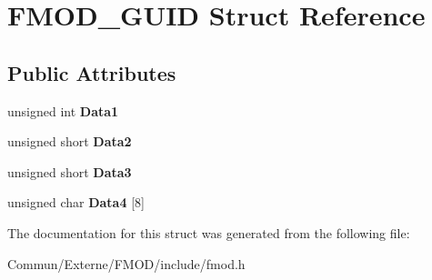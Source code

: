 \hypertarget{struct_f_m_o_d___g_u_i_d}{}\section{F\+M\+O\+D\+\_\+\+G\+U\+ID Struct Reference}
\label{struct_f_m_o_d___g_u_i_d}
\subsection*{Public Attributes}
\begin{DoxyCompactItemize}
\item 
unsigned int {\bfseries Data1}\hypertarget{struct_f_m_o_d___g_u_i_d_ade5cc5a3c9665147a488c8a9e2ea211c}{}\label{struct_f_m_o_d___g_u_i_d_ade5cc5a3c9665147a488c8a9e2ea211c}

\item 
unsigned short {\bfseries Data2}\hypertarget{struct_f_m_o_d___g_u_i_d_ac5805cdbaf5cfa2113d637e11f6ad36e}{}\label{struct_f_m_o_d___g_u_i_d_ac5805cdbaf5cfa2113d637e11f6ad36e}

\item 
unsigned short {\bfseries Data3}\hypertarget{struct_f_m_o_d___g_u_i_d_a98f6f2f06cad235236cbc86099aa4e96}{}\label{struct_f_m_o_d___g_u_i_d_a98f6f2f06cad235236cbc86099aa4e96}

\item 
unsigned char {\bfseries Data4} \mbox{[}8\mbox{]}\hypertarget{struct_f_m_o_d___g_u_i_d_a3a1337ea3f0bec8fbddd197ebdb29cf7}{}\label{struct_f_m_o_d___g_u_i_d_a3a1337ea3f0bec8fbddd197ebdb29cf7}

\end{DoxyCompactItemize}


The documentation for this struct was generated from the following file\+:\begin{DoxyCompactItemize}
\item 
Commun/\+Externe/\+F\+M\+O\+D/include/fmod.\+h\end{DoxyCompactItemize}
